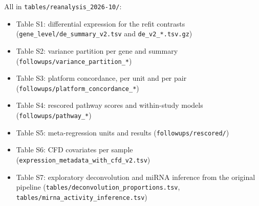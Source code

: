 \documentclass[11pt,a4paper]{article}
\begin{document}
All in \texttt{tables/reanalysis\_2026-10/}:
\begin{itemize}
    \item Table S1: differential expression for the refit contrasts (\texttt{gene\_level/de\_summary\_v2.tsv} and \texttt{de\_v2\_*.tsv.gz})
    \item Table S2: variance partition per gene and summary (\texttt{followups/variance\_partition\_*})
    \item Table S3: platform concordance, per unit and per pair (\texttt{followups/platform\_concordance\_*})
    \item Table S4: rescored pathway scores and within-study models (\texttt{followups/pathway\_*})
    \item Table S5: meta-regression units and results (\texttt{followups/rescored/})
    \item Table S6: CFD covariates per sample (\texttt{expression\_metadata\_with\_cfd\_v2.tsv})
    \item Table S7: exploratory deconvolution and miRNA inference from the original pipeline (\texttt{tables/deconvolution\_proportions.tsv}, \texttt{tables/mirna\_activity\_inference.tsv})
\end{itemize}


\end{document}
